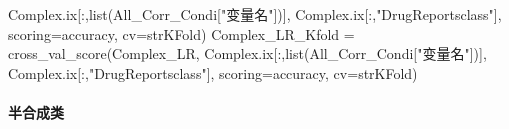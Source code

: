 \documentclass[
]{article}
\newenvironment{Shaded}{}{}
\newcommand{\BuiltInTok}[1]{#1}
\newcommand{\NormalTok}[1]{#1}
\newcommand{\OperatorTok}[1]{\textcolor[rgb]{0.40,0.40,0.40}{#1}}
\newcommand{\StringTok}[1]{\textcolor[rgb]{0.25,0.44,0.63}{#1}}
\begin{document}
\begin{Shaded}
\begin{Highlighting}[]
\NormalTok{                            Complex.ix[:,}\BuiltInTok{list}\NormalTok{(All\_Corr\_Condi[}\StringTok{"变量名"}\NormalTok{])],}
\NormalTok{                            Complex.ix[:,}\StringTok{"DrugReportsclass"}\NormalTok{],}
\NormalTok{                            scoring}\OperatorTok{=}\StringTok{\textquotesingle{}accuracy\textquotesingle{}}\NormalTok{,}
\NormalTok{                            cv}\OperatorTok{=}\NormalTok{strKFold)}
\NormalTok{Complex\_LR\_Kfold }\OperatorTok{=}\NormalTok{ cross\_val\_score(Complex\_LR,}
\NormalTok{                            Complex.ix[:,}\BuiltInTok{list}\NormalTok{(All\_Corr\_Condi[}\StringTok{"变量名"}\NormalTok{])],}
\NormalTok{                            Complex.ix[:,}\StringTok{"DrugReportsclass"}\NormalTok{],}
\NormalTok{                            scoring}\OperatorTok{=}\StringTok{\textquotesingle{}accuracy\textquotesingle{}}\NormalTok{,}
\NormalTok{                            cv}\OperatorTok{=}\NormalTok{strKFold)}
\end{Highlighting}
\end{Shaded}

\hypertarget{header-n323}{%
\paragraph{半合成类}\label{header-n323}}
\end{document}
